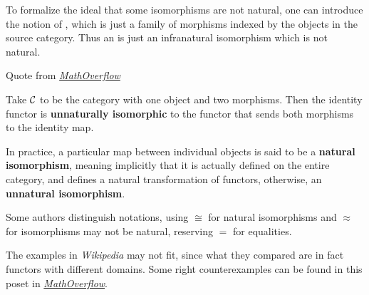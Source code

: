   To formalize the ideal that some isomorphisms are not natural, one can introduce the notion of , which is just a family of morphisms indexed by the objects in the source category. Thus an  is just an infranatural isomorphism which is not natural.

  \begin{exam}
    Quote from \href{http://mathoverflow.net/a/139392/43771}{\emph{MathOverflow}}

    Take ${\cal C}$ to be the category with one object and two morphisms. Then the identity functor is \textbf{unnaturally isomorphic} to the functor that sends both morphisms to the identity map.
  \end{exam}

  In practice, a particular map between individual objects is said to be a \textbf{natural isomorphism}, meaning implicitly that it is actually defined on the entire category, and defines a natural transformation of functors, otherwise, an \textbf{unnatural isomorphism}.
  \begin{rem}
    Some authors distinguish notations, using $\cong$ for natural isomorphisms and $\approx$ for isomorphisms may not be natural, reserving $=$ for equalities.
  \end{rem}

  The examples in \emph{Wikipedia} may not fit, since what they compared are in fact functors with different domains.
   Some right counterexamples can be found in this poset in \href{http://mathoverflow.net/questions/139388/example-of-an-unnatural-isomorphism}{\emph{MathOverflow}}.

